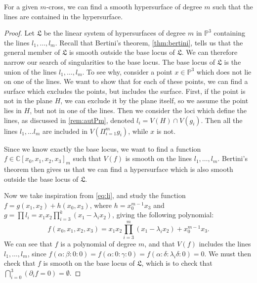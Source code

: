 \begin{proposition}
    For a given $m$-cross, we can find a smooth hypersurface of degree $m$ such that the lines are contained in the hypersurface.
\end{proposition}
\begin{proof}
    Let $\mathfrak{L}$ be the linear system of hypersurfaces of degree $m$ in $\mathbb{P}^3$ containing the lines $l_1, \dots, l_m$. Recall that Bertini's theorem, \cref{thm:bertini}, tells us that the general member of $\mathfrak{L}$ is smooth outside the base locus of $\mathfrak{L}$. We can therefore narrow our search of singularities to the base locus. The base locus of $\mathfrak{L}$ is the union of the lines $l_1, \dots, l_m$. To see why, consider a point $x \in \mathbb{P}^3$ which does not lie on one of the lines. We want to show that for each of these points, we can find a surface which excludes the points, but includes the surface. First, if the point is not in the plane $H$, we can exclude it by the plane itself, so we assume the point lies in $H$, but not in one of the lines. 
    Then we consider the loci which define the lines, as discussed in \cref{rem:autPm}, denoted $l_i = V(H) \cap V(g_i)$. Then all the lines $l_1, \dots l_m$ are included in $V(\Pi_{i=1}^m g_i)$, while $x$ is not. 
    
    Since we know exactly the base locus, we want to find a function $f \in \mathbb{C}[x_0, x_1, x_2, x_3]_m$ such that $V(f)$ is smooth on the lines $l_1, \dots, l_m$. Bertini's theorem then gives us that we can find a hypersurface which is also smooth outside the base locus of $\mathfrak{L}$.

   Now we take inspiration from \ref{eq:li}, and study the function $f = g(x_1, x_2) + h(x_0, x_3)$, where $h = x_0^{m-1}x_3$ and $g = \prod l_i = x_1x_2 \prod_{i=3}^k (x_1 - \lambda_i x_2)$, giving the following polynomial:
    \[
        f(x_0, x_1, x_2, x_3) = x_1x_2 \prod_{i=3}^m (x_1 - \lambda_i x_2) + x_0^{m-1}x_3.
    \]
    We can see that $f$ is a polynomial of degree $m$, and that $V(f)$ includes the lines $l_1, \dots, l_m$, since $f(\alpha: \beta: 0: 0) = f(\alpha: 0: \gamma: 0) = f(\alpha: \delta: \lambda_i \delta: 0) = 0$. We must then check that $f$ is smooth on the base locus of $\mathfrak{L}$, which is to check that $\bigcap_{i=0}^3 (\partial_i f = 0) = \emptyset$. 
    

\end{proof}

